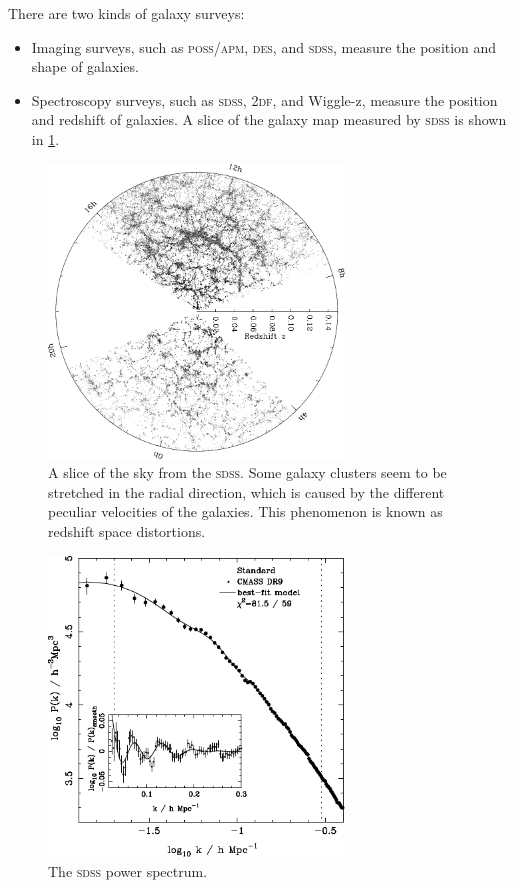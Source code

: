 There are two kinds of galaxy surveys:
\begin{itemize}
	\item Imaging surveys, such as \textsc{poss}/\textsc{apm}, \textsc{des}, and \textsc{sdss}, measure the position and shape of galaxies.
	\item Spectroscopy surveys, such as \textsc{sdss}, \textsc{2df}, and Wiggle-z, measure the position and redshift of galaxies. A slice of the galaxy map measured by \textsc{sdss} is shown in \cref{fig:spectroscopic-survey}.
\end{itemize}

\begin{figure}
	\centering
	\includegraphics[width=0.7\textwidth]{img/ch-03/sdss.jpeg}
	\caption{A slice of the sky from the \textsc{sdss}. Some galaxy clusters seem to be stretched in the radial direction, which is caused by the different peculiar velocities of the galaxies. This phenomenon is known as redshift space distortions.}
	\label{fig:spectroscopic-survey}
\end{figure}

\begin{figure}
	\centering
	\includegraphics[width=0.7\textwidth]{img/ch-03/sdss-power-spectrum.pdf}
	\caption{The \textsc{sdss} power spectrum.}
	\label{fig:sdss-power-spectrum}
\end{figure}

